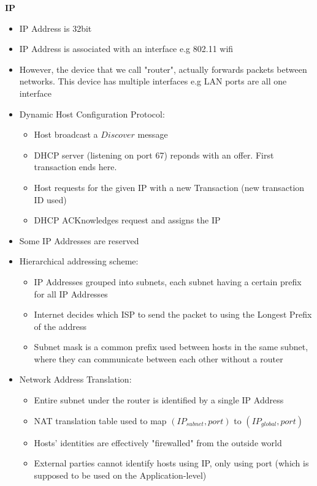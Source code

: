 \documentclass[a4paper]{article} \usepackage[backend=biber, style=numeric, sorting=none]{biblatex}
\begin{document}
\begin{multicols*}{4}
\textbf{IP}
\begin{itemize}[leftmargin=*]
\item IP Address is 32bit
\item IP Address is associated with an interface e.g 802.11 wifi
\item However, the device that we call "router", actually forwards packets between networks. This device has multiple interfaces e.g LAN ports are all one interface
\item Dynamic Host Configuration Protocol:
  \begin{itemize}[leftmargin=*]
  \item Host broadcast a $Discover$ message
  \item DHCP server (listening on port 67) reponds with an offer. First transaction ends here.
  \item Host requests for the given IP with a new Transaction (new transaction ID used)
  \item DHCP ACKnowledges request and assigns the IP
  \end{itemize}
\item Some IP Addresses are reserved
\item Hierarchical addressing scheme:
  \begin{itemize}[leftmargin=*]
  \item IP Addresses grouped into subnets, each subnet having a certain prefix for all IP Addresses
  \item Internet decides which ISP to send the packet to using the Longest Prefix of the address
  \item Subnet mask is a common prefix used between hosts in the same subnet, where they can communicate between each other without a router
  \end{itemize}
\item Network Address Translation:
  \begin{itemize}[leftmargin=*]
  \item Entire subnet under the router is identified by a single IP Address
  \item NAT translation table used to map $(IP_{subnet}, port)$ to $(IP_{global}, port)$
  \item Hosts' identities are effectively "firewalled" from the outside world
  \item External parties cannot identify hosts using IP, only using port (which is supposed to be used on the Application-level)
  \end{itemize}
\end{itemize}


\end{multicols*}
\end{document}
